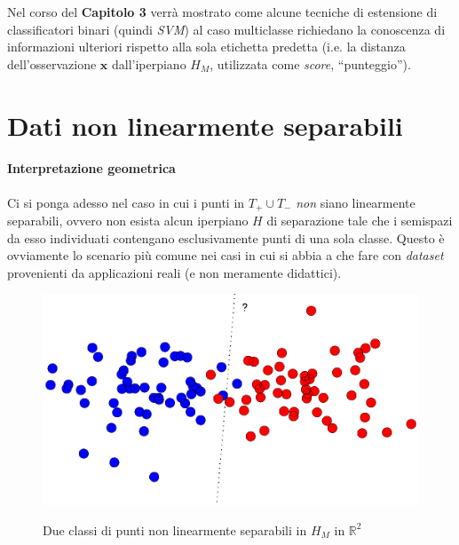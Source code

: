 Nel corso del \textbf{Capitolo 3} verrà mostrato come alcune tecniche di estensione di classificatori binari (quindi \textit{SVM}) al caso multiclasse richiedano la conoscenza di informazioni ulteriori rispetto alla sola etichetta predetta (i.e. la distanza dell'osservazione $\boldsymbol{x}$ dall'iperpiano $H_M$, utilizzata come \textit{score}, ``punteggio'').


\section{Dati non linearmente separabili}

\paragraph{Interpretazione geometrica}
Ci si ponga adesso nel caso in cui i punti in $T_+ \cup T_-$ \textit{non} siano linearmente separabili, ovvero non esista alcun iperpiano $H$ di separazione tale che i semispazi da esso individuati contengano esclusivamente punti di una sola classe.
Questo è ovviamente lo scenario più comune nei casi in cui si abbia a che fare con \textit{dataset} provenienti da applicazioni reali (e non meramente didattici).

\begin{figure}[H] %
 	\centering	
	
	\fboxsep=0mm%
	\fboxrule=1mm%

	 {
		\includegraphics[scale=1]{img/FiguraD_nonseparabili.eps}
	}	
	\caption{Due classi di punti non linearmente separabili in $H_M$ in $\mathbb{R}^2$}
\end{figure}

